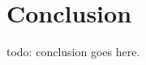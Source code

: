 \documentclass{article} %
\begin{document}
\section{Conclusion}
todo: conclusion goes here.
%
%
%
%
%
%
%
\end{document}

